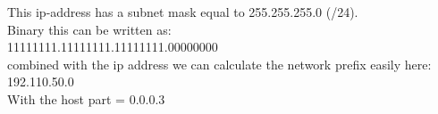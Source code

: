 This ip-address has a subnet mask equal to 255.255.255.0 (/24).\\
Binary this can be written as: \\
11111111.11111111.11111111.00000000\\
combined with the ip address we can calculate the network prefix easily here:\\
192.110.50.0\\
With the host part = 0.0.0.3\\